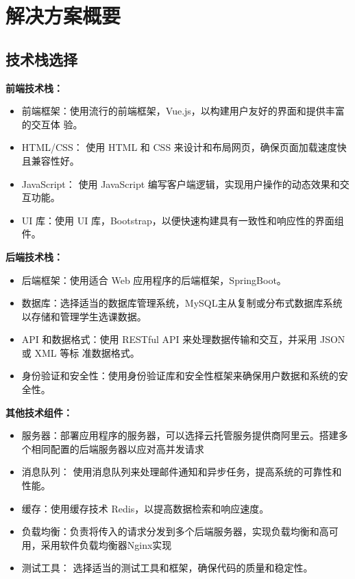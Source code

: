\documentclass{article}
\begin{document}
\section{解决方案概要}
\subsection{技术栈选择}
\textbf{前端技术栈：}

\begin{itemize}
  \item 前端框架：使用流行的前端框架，Vue.js，以构建用户友好的界面和提供丰富的交互体
  验。
  \item HTML/CSS： 使用 HTML 和 CSS 来设计和布局网页，确保页面加载速度快且兼容性好。
  \item JavaScript： 使用 JavaScript 编写客户端逻辑，实现用户操作的动态效果和交互功能。
  \item UI 库：使用 UI 库，Bootstrap，以便快速构建具有一致性和响应性的界面组件。
\end{itemize}

\textbf{后端技术栈：}

\begin{itemize}
  \item 后端框架：使用适合 Web 应用程序的后端框架，SpringBoot。
  \item 数据库：选择适当的数据库管理系统，MySQL主从复制或分布式数据库系统 以存储和管理学生选课数据。
  \item API 和数据格式：使用 RESTful API 来处理数据传输和交互，并采用 JSON 或 XML 等标
  准数据格式。
  \item 身份验证和安全性：使用身份验证库和安全性框架来确保用户数据和系统的安全性。
\end{itemize}

\textbf{其他技术组件：}

\begin{itemize}
  \item 服务器：部署应用程序的服务器，可以选择云托管服务提供商阿里云。搭建多个相同配置的后端服务器以应对高并发请求
  \item 消息队列： 使用消息队列来处理邮件通知和异步任务，提高系统的可靠性和性能。
  \item 缓存：使用缓存技术 Redis，以提高数据检索和响应速度。
  \item 负载均衡：负责将传入的请求分发到多个后端服务器，实现负载均衡和高可用，采用软件负载均衡器Nginx实现
  \item 测试工具： 选择适当的测试工具和框架，确保代码的质量和稳定性。
\end{itemize}
\end{document}
